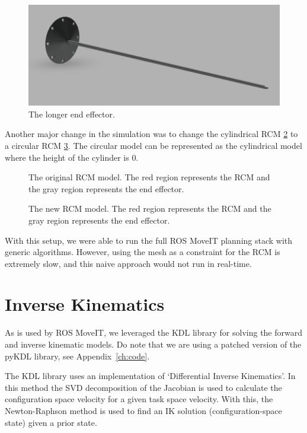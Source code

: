 \documentclass[BTech]{iitmdiss}
\begin{document}
    \begin{figure}
        \centering
        \includegraphics[width=0.75 \linewidth]{./img/longer_end_effector}
        \caption{The longer end effector.}
        \label{fig:longer_ee}
    \end{figure}

    Another major change in the simulation was to change the cylindrical RCM \ref{fig:rcm_cylinder} to a circular RCM \ref{fig:rcm_circle}.
    The circular model can be represented as the cylindrical model where the height of the cylinder is 0.

    \begin{figure}
        \centering
        
        \caption{The original RCM model. The red region represents the RCM and the gray region represents the end effector.}
        \label{fig:rcm_cylinder}
    \end{figure}

    \begin{figure}
        \centering
        
        \caption{The new RCM model. The red region represents the RCM and the gray region represents the end effector.}
        \label{fig:rcm_circle}
    \end{figure}

    With this setup, we were able to run the full ROS MoveIT planning stack with generic algorithms.
    However, using the mesh as a constraint for the RCM is extremely slow, and this naive approach would not run in real-time.


    \section{Inverse Kinematics}

    As is used by ROS MoveIT, we leveraged the KDL library for solving the forward and inverse kinematic models.
    Do note that we are using a patched version of the pyKDL library, see Appendix~\ref{ch:code}.

    The KDL library uses an implementation of `Differential Inverse Kinematics'.
    In this method the SVD decomposition of the Jacobian is used to calculate the configuration space velocity for a given task space velocity.
    With this, the Newton-Raphson method is used to find an IK solution (configuration-space state) given a prior state.
\end{document}
